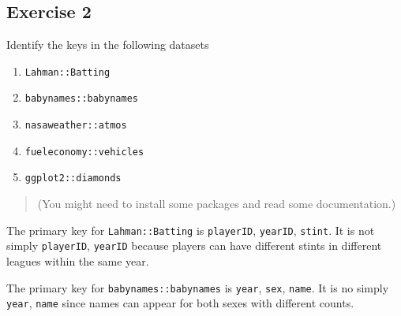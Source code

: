 \documentclass[]{book}
\newenvironment{Shaded}{\begin{snugshade}}{\end{snugshade}}
\newcommand{\CommentTok}[1]{\textcolor[rgb]{0.56,0.35,0.01}{\textit{#1}}}
\newcommand{\DecValTok}[1]{\textcolor[rgb]{0.00,0.00,0.81}{#1}}
\newcommand{\KeywordTok}[1]{\textcolor[rgb]{0.13,0.29,0.53}{\textbf{#1}}}
\newcommand{\NormalTok}[1]{#1}
\newcommand{\OperatorTok}[1]{\textcolor[rgb]{0.81,0.36,0.00}{\textbf{#1}}}
\newcommand{\StringTok}[1]{\textcolor[rgb]{0.31,0.60,0.02}{#1}}
\providecommand{\tightlist}{%
  \setlength{\itemsep}{0pt}\setlength{\parskip}{0pt}}
\theoremstyle{definition}
\theoremstyle{definition}
\theoremstyle{definition}
\theoremstyle{remark}
\begin{document}
\hypertarget{exercise-2-21}{%
\subsection{Exercise 2}\label{exercise-2-21}}

Identify the keys in the following datasets

\begin{enumerate}
\def\labelenumi{\arabic{enumi}.}
\tightlist
\item
  \texttt{Lahman::Batting}
\item
  \texttt{babynames::babynames}
\item
  \texttt{nasaweather::atmos}
\item
  \texttt{fueleconomy::vehicles}
\item
  \texttt{ggplot2::diamonds}
\end{enumerate}

\begin{quote}
(You might need to install some packages and read some documentation.)
\end{quote}

The primary key for \texttt{Lahman::Batting} is \texttt{playerID},
\texttt{yearID}, \texttt{stint}. It is not simply \texttt{playerID},
\texttt{yearID} because players can have different stints in different
leagues within the same year.

\begin{Shaded}
\end{Shaded}

The primary key for \texttt{babynames::babynames} is \texttt{year},
\texttt{sex}, \texttt{name}. It is no simply \texttt{year},
\texttt{name} since names can appear for both sexes with different
counts.

\begin{Shaded}
\end{Shaded}
\end{document}
